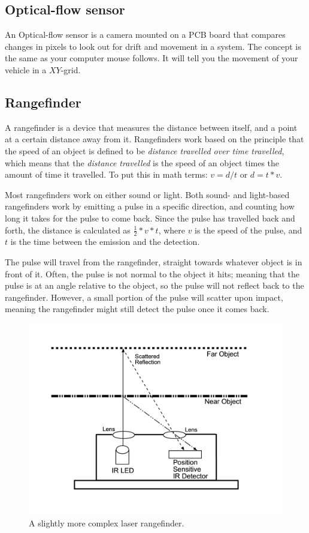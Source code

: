 \subsection{Optical-flow sensor}
An Optical-flow sensor is a camera mounted on a PCB board that compares changes in pixels to look out for drift and movement in a system. The concept is the same as your computer mouse follows. It will tell you the movement of your vehicle in a $XY$-grid.

\subsection{Rangefinder}
A rangefinder is a device that measures the distance between itself, and a point at a certain distance away from it. Rangefinders work based on the principle that the speed of an object is defined to be \textit{distance travelled over time travelled}, which means that the \textit{distance travelled} is the speed of an object times the amount of time it travelled. To put this in math terms: \(v=d/t\) or \(d=t*v\).

Most rangefinders work on either sound or light. Both sound- and light-based rangefinders work by emitting a pulse in a specific direction, and counting how long it takes for the pulse to come back. Since the pulse has travelled back and forth, the distance is calculated as \(\frac{1}{2}*v*t\), where \(v\) is the speed of the pulse, and \(t\) is the time between the emission and the detection.

The pulse will travel from the rangefinder, straight towards whatever object is in front of it. Often, the pulse is not normal to the object it hits; meaning that the pulse is at an angle relative to the object, so the pulse will not reflect back to the rangefinder. However, a small portion of the pulse will scatter upon impact, meaning the rangefinder might still detect the pulse once it comes back.

\begin{figure}[H]
	\centering
	\includegraphics[width=.6\linewidth]{images/rangefinder.jpg}
	\caption{A slightly more complex laser rangefinder.}
	\label{fig:rangefinderIMG}
\end{figure}

